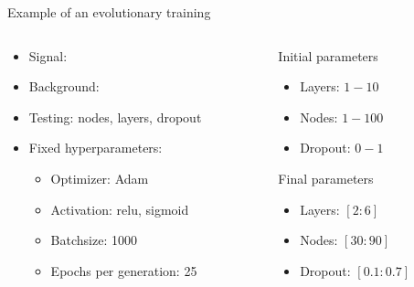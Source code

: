 \begin{frame}{Example of an evolutionary training}
    \begin{columns}
        \begin{column}{0.5\textwidth}
            \vspace{-0.4cm}
            \begin{itemize}
                \item Signal: \tHq
                \vspace{0.3cm}
                \item Background: \ttbar
                \vspace{0.3cm}
                \item Testing: nodes, layers, dropout
                \vspace{0.3cm}
                \item Fixed hyperparameters:
                    \begin{itemize}
                        \item Optimizer: Adam
                        \item Activation: relu, sigmoid
                        \item Batchsize: 1000
                        \item Epochs per generation: 25
                    \end{itemize}
            \end{itemize}
        \end{column}
            \begin{column}{0.5\textwidth}
                \begin{block}{Initial parameters}
                    \begin{itemize}
                        \item Layers: $1-10$
                        \item Nodes: $1-100$
                        \item Dropout: $0-1$
                    \end{itemize}
                \end{block}
                \begin{block}{Final parameters}
                    \begin{itemize}
                        \item Layers: $[2:6]$
                        \item Nodes: $[30:90]$
                        \item Dropout: $[0.1:0.7]$
                    \end{itemize}
                \end{block}
        \end{column}
    \end{columns}
\end{frame}


